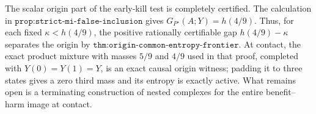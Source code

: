 The scalar origin part of the early-kill test is completely certified.  The calculation in \(\texttt{prop:strict-mi-false-inclusion}\) gives \(G_{P^\star}(A;Y)=h(4/9)\).  Thus, for each fixed \(\kappa<h(4/9)\), the positive rationally certifiable gap \(h(4/9)-\kappa\) separates the origin by \(\texttt{thm:origin-common-entropy-frontier}\).  At contact, the exact product mixture with masses \(5/9\) and \(4/9\) used in that proof, completed with \(Y(0)=Y(1)=Y\), is an exact causal origin witness; padding it to three states gives a zero third mass and its entropy is exactly active.  What remains open is a terminating construction of nested complexes for the entire benefit--harm image at contact.